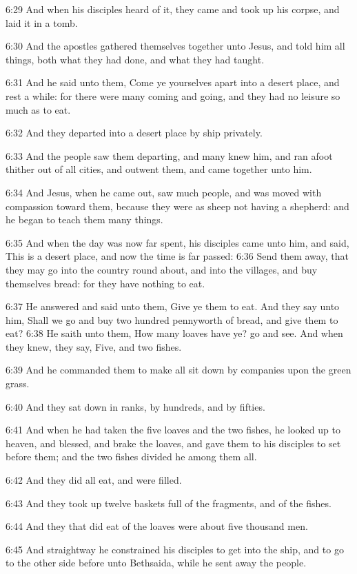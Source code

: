 6:29 And when his disciples heard of it, they came and took up his
corpse, and laid it in a tomb.

6:30 And the apostles gathered themselves together unto Jesus, and
told him all things, both what they had done, and what they had
taught.

6:31 And he said unto them, Come ye yourselves apart into a desert
place, and rest a while: for there were many coming and going, and
they had no leisure so much as to eat.

6:32 And they departed into a desert place by ship privately.

6:33 And the people saw them departing, and many knew him, and ran
afoot thither out of all cities, and outwent them, and came together
unto him.

6:34 And Jesus, when he came out, saw much people, and was moved with
compassion toward them, because they were as sheep not having a
shepherd: and he began to teach them many things.

6:35 And when the day was now far spent, his disciples came unto him,
and said, This is a desert place, and now the time is far passed: 6:36
Send them away, that they may go into the country round about, and
into the villages, and buy themselves bread: for they have nothing to
eat.

6:37 He answered and said unto them, Give ye them to eat. And they say
unto him, Shall we go and buy two hundred pennyworth of bread, and
give them to eat?  6:38 He saith unto them, How many loaves have ye?
go and see. And when they knew, they say, Five, and two fishes.

6:39 And he commanded them to make all sit down by companies upon the
green grass.

6:40 And they sat down in ranks, by hundreds, and by fifties.

6:41 And when he had taken the five loaves and the two fishes, he
looked up to heaven, and blessed, and brake the loaves, and gave them
to his disciples to set before them; and the two fishes divided he
among them all.

6:42 And they did all eat, and were filled.

6:43 And they took up twelve baskets full of the fragments, and of the
fishes.

6:44 And they that did eat of the loaves were about five thousand men.

6:45 And straightway he constrained his disciples to get into the
ship, and to go to the other side before unto Bethsaida, while he sent
away the people.

